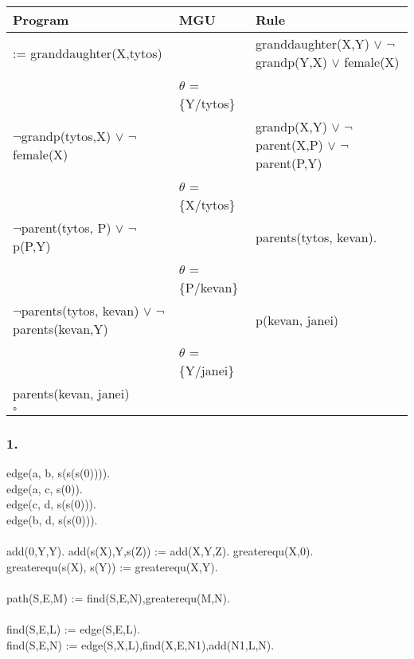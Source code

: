 \documentclass[10pt, a4paper]{article}
\begin{document}
\begin{tabular}{L{4cm} |L{3cm} |L{5cm}}
Program & MGU & Rule  \\
\hline \hline
:= granddaughter(X,tytos) & & granddaughter(X,Y) $\vee$ $\neg$grandp(Y,X) \newline $\vee$ female(X) \\
                          &  $\theta$ = \{Y/tytos\}               &   \\         \hline
$\neg$grandp(tytos,X) $\vee$ $\neg$female(X) &  & grandp(X,Y) $\vee$ $\neg$parent(X,P) $\vee$ $\neg$parent(P,Y) \\

                          & $\theta$ = \{X/tytos\}              & \\
\hline
$\neg$parent(tytos, P) $\vee$ $\neg$p(P,Y)&                   &  parents(tytos, kevan). \\
                          & $\theta$ = \{P/kevan\}            & \\
\hline
$\neg$parents(tytos, kevan) $\vee$ $\neg$parents(kevan,Y) &      & p(kevan, janei) \\
                          & $\theta$ = \{Y/janei\}            & \\
\hline
parents(kevan, janei)       &             & \\
$\square$  & &



\end{tabular}


\setcounter{secnumdepth}{1}
\subsubsection{1.}

edge(a, b, s(s(s(0)))).\\
edge(a, c, s(0)).\\
edge(c, d, s(s(0))).\\
edge(b, d, s(s(0))).\\\\
add(0,Y,Y).
add(s(X),Y,s(Z)) := add(X,Y,Z).
greaterequ(X,0).\\
greaterequ(s(X), s(Y)) := greaterequ(X,Y).\\\\
path(S,E,M) := find(S,E,N),greaterequ(M,N).\\\\
find(S,E,L) := edge(S,E,L).\\
find(S,E,N) := edge(S,X,L),find(X,E,N1),add(N1,L,N).
\end{document}
